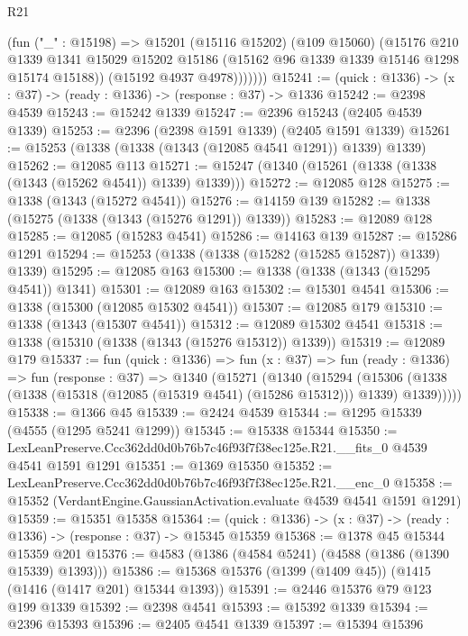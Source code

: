 \begin{lexlean}{R21}
\begin{coremodule}
              (fun ("_" : @15198) =>
              @15201
                (@15116 @15202)
                (@109 @15060)
                (@15176
                  @210
                  @1339
                  @1341
                  @15029
                  @15202
                  @15186
                  (@15162 @96 @1339 @1339 @15146 @1298 @15174 @15188))
                (@15192 @4937 @4978)))))))
@15241 := (quick : @1336) -> (x : @37) -> (ready : @1336) -> (response : @37) -> @1336
@15242 := @2398 @4539
@15243 := @15242 @1339
@15247 := @2396 @15243 (@2405 @4539 @1339)
@15253 := @2396 (@2398 @1591 @1339) (@2405 @1591 @1339)
@15261 := @15253 (@1338 (@1338 (@1343 (@12085 @4541 @1291)) @1339) @1339)
@15262 := @12085 @113
@15271 := @15247 (@1340 (@15261 (@1338 (@1338 (@1343 (@15262 @4541)) @1339) @1339)))
@15272 := @12085 @128
@15275 := @1338 (@1343 (@15272 @4541))
@15276 := @14159 @139
@15282 := @1338 (@15275 (@1338 (@1343 (@15276 @1291)) @1339))
@15283 := @12089 @128
@15285 := @12085 (@15283 @4541)
@15286 := @14163 @139
@15287 := @15286 @1291
@15294 := @15253 (@1338 (@1338 (@15282 (@15285 @15287)) @1339) @1339)
@15295 := @12085 @163
@15300 := @1338 (@1338 (@1343 (@15295 @4541)) @1341)
@15301 := @12089 @163
@15302 := @15301 @4541
@15306 := @1338 (@15300 (@12085 @15302 @4541))
@15307 := @12085 @179
@15310 := @1338 (@1343 (@15307 @4541))
@15312 := @12089 @15302 @4541
@15318 := @1338 (@15310 (@1338 (@1343 (@15276 @15312)) @1339))
@15319 := @12089 @179
@15337 := fun (quick : @1336) =>
  fun (x : @37) =>
  fun (ready : @1336) =>
  fun (response : @37) =>
  @1340
    (@15271
      (@1340
        (@15294
          (@15306 (@1338 (@1338 (@15318 (@12085 (@15319 @4541) (@15286 @15312))) @1339) @1339)))))
@15338 := @1366 @45
@15339 := @2424 @4539
@15344 := @1295 @15339 (@4555 (@1295 @5241 @1299))
@15345 := @15338 @15344
@15350 := LexLeanPreserve.Ccc362dd0d0b76b7c46f93f7f38ec125e.R21.__fits_0 @4539 @4541 @1591 @1291
@15351 := @1369 @15350
@15352 := LexLeanPreserve.Ccc362dd0d0b76b7c46f93f7f38ec125e.R21.__enc_0
@15358 := @15352 (VerdantEngine.GaussianActivation.evaluate @4539 @4541 @1591 @1291)
@15359 := @15351 @15358
@15364 := (quick : @1336) -> (x : @37) -> (ready : @1336) -> (response : @37) -> @15345 @15359
@15368 := @1378 @45 @15344 @15359 @201
@15376 := @4583 (@1386 (@4584 @5241) (@4588 (@1386 (@1390 @15339) @1393)))
@15386 := @15368 @15376 (@1399 (@1409 @45)) (@1415 (@1416 (@1417 @201) @15344 @1393))
@15391 := @2446 @15376 @79 @123 @199 @1339
@15392 := @2398 @4541
@15393 := @15392 @1339
@15394 := @2396 @15393
@15396 := @2405 @4541 @1339
@15397 := @15394 @15396

\end{coremodule}
\end{lexlean}
